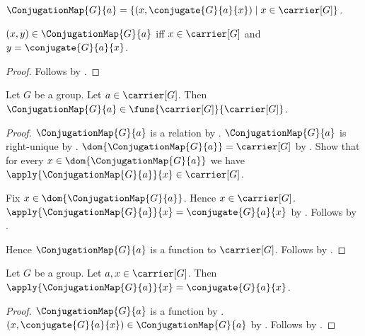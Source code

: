 \begin{definition}\label{conjugation_map}
    $\ConjugationMap{G}{a}=
        \{(x,\conjugate{G}{a}{x})\mid x\in\carrier[G]\}$.
\end{definition}

\begin{proposition}\label{conjugation_map_iff}
    $(x,y)\in\ConjugationMap{G}{a}$ iff
        $x\in\carrier[G]$ and $y=\conjugate{G}{a}{x}$.
\end{proposition}
\begin{proof}
    Follows by .
\end{proof}

\begin{proposition}\label{conjugation_map_function}
    Let $G$ be a group.
    Let $a\in\carrier[G]$.
    Then $\ConjugationMap{G}{a}\in
        \funs{\carrier[G]}{\carrier[G]}$.
\end{proposition}
\begin{proof}
    $\ConjugationMap{G}{a}$ is a relation by
        .
    $\ConjugationMap{G}{a}$ is right-unique by
        .
    $\dom{\ConjugationMap{G}{a}}=\carrier[G]$ by
        .
    Show that for every $x\in\dom{\ConjugationMap{G}{a}}$ we have
        $\apply{\ConjugationMap{G}{a}}{x}\in\carrier[G]$.
    \begin{subproof}
        Fix $x\in\dom{\ConjugationMap{G}{a}}$.
        Hence $x\in\carrier[G]$.
        $\apply{\ConjugationMap{G}{a}}{x}=\conjugate{G}{a}{x}$ by
            .
        Follows by .
    \end{subproof}
    Hence $\ConjugationMap{G}{a}$ is a function to $\carrier[G]$.
    Follows by .
\end{proof}

\begin{proposition}\label{conjugation_map_apply}
    Let $G$ be a group.
    Let $a,x\in\carrier[G]$.
    Then
        $\apply{\ConjugationMap{G}{a}}{x}=\conjugate{G}{a}{x}$.
\end{proposition}
\begin{proof}
    $\ConjugationMap{G}{a}$ is a function by
        .
    $(x,\conjugate{G}{a}{x})\in\ConjugationMap{G}{a}$ by
        .
    Follows by .
\end{proof}

